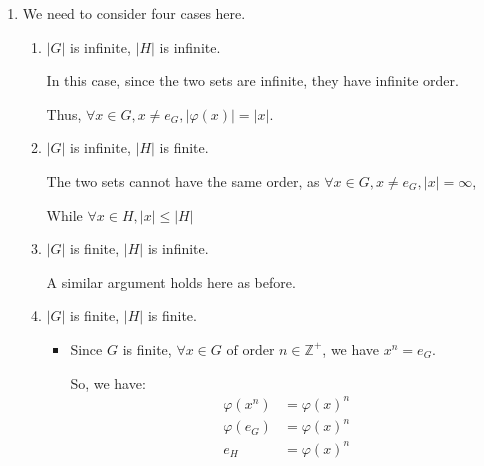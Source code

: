 \documentclass[12pt,letterpaper]{article}
\begin{document}
\begin{enumerate}
\begin{proof}
\begin{itemize}
            From these results, we see that $Z(G) \le G$ is a subgroup.

          \item

            We show that $Z(G) \triangleleft G$ is normal.
            Equivalently, $\forall g \in G, gZ(G) = Z(G)g$.

            By definition of $Z(G) = \{z \in G | \forall g \in G, zg = gz\}$.

            This is exactly the definition of the normal.

            Thus, $Z(G) \triangleleft G$ is normal by construction.
        \end{itemize}

        From these two results,
        we have shown that the center of a group is a normal subgroup.
      \end{proof}

    \item
      We need to consider four cases here.

      \begin{enumerate}
        \item $|G|$ is infinite, $|H|$ is infinite.

          In this case, since the two sets are infinite,
          they have infinite order.

          Thus, $\forall x \in G, x \ne e_G, |\varphi(x)| = |x|$.

        \item $|G|$ is infinite, $|H|$ is finite.

          The two sets cannot have the same order,
          as $\forall x \in G, x \ne e_G, |x| = \infty$,

          While $\forall x \in H, |x| \le |H|$

        \item $|G|$ is finite, $|H|$ is infinite.

          A similar argument holds here as before.

        \item $|G|$ is finite, $|H|$ is finite.

          \begin{itemize}
            \item
              Since $G$ is finite, $\forall x \in G \text{ of order } n \in \mathbb{Z^+}$,
              we have $x^n = e_G$.

              So, we have:
              \begin{align*}
                \varphi(x^n) &= \varphi(x)^n \\
                \varphi(e_G) &= \varphi(x)^n \\
                e_H &= \varphi(x)^n \\
              \end{align*}


\end{itemize}
\end{enumerate}
\end{enumerate}
\end{document}
